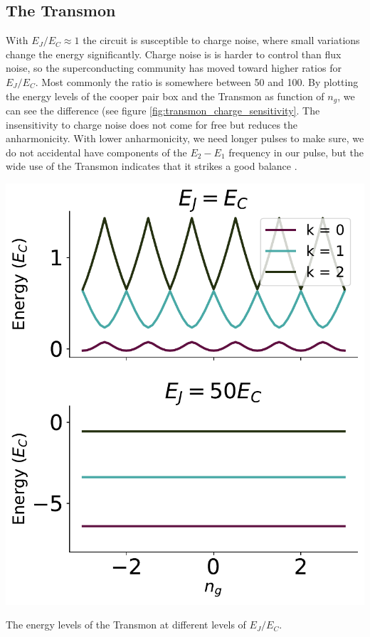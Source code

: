 \subsection{The Transmon}
With $E_J / E_C \approx 1$ the circuit is susceptible to charge noise, where small variations change the energy significantly. Charge noise is is harder to control than flux noise, so the superconducting community has moved toward higher ratios for $E_J / E_C$. Most commonly the ratio is somewhere between 50 and 100. By plotting the energy levels of the cooper pair box and the Transmon as function of $n_g$, we can see the difference (see figure \ref{fig:transmon_charge_sensitivity}. The insensitivity to charge noise does not come for free but reduces the anharmonicity. With lower anharmonicity, we need longer pulses to make sure, we do not accidental have components of the $E_2 - E_1$ frequency in our pulse, but the wide use of the Transmon indicates that it strikes a good balance \cite{koch_charge_2007}. 
\begin{marginfigure}
    \centering
    \includegraphics[width = 1.00 \linewidth]{Figs/Theory/Transmon_energy_vs_ng.pdf}
    \caption{The energy levels of the Transmon at different levels of $E_J / E_C$.}
    \label{fig:transmon_charge_sensitivity}
\end{marginfigure}

